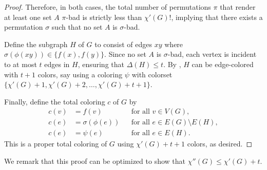 \begin{proof}
    Therefore,
    in both cases,
    the total number of permutations \(\pi\) that render at least one set \(A\) \(\pi\)-bad is strictly less than \(\chi'(G)!\),
    implying that there exists a permutation \(\sigma\) such that no set \(A\) is \(\sigma\)-bad.
    
    Define the subgraph \(H\) of \(G\) to consist of edges \(xy\) where \(\sigma(\phi(xy)) \in \{ f(x), f(y) \}\).
    Since no set \(A\) is \(\sigma\)-bad, each vertex is incident to at most \(t\) edges in \(H\), ensuring that \(\Delta(H) \leq t\).
    By , \(H\) can be edge-colored with \(t + 1\) colors, say using a coloring \(\psi\) with colorset \(\{\chi'(G) + 1, \chi'(G) + 2, \ldots, \chi'(G) + t + 1\}\).
    
    Finally, define the total coloring \(c\) of \(G\) by
    \begin{align}
        c(v) & = f(v)            && \text{for all } v \in V(G),                \\
        c(e) & = \sigma(\phi(e)) && \text{for all } e \in E(G) \setminus E(H), \\
        c(e) & = \psi(e)         && \text{for all } e \in E(H).
    \end{align}
    This is a proper total coloring of \(G\) using \(\chi'(G) + t + 1\) colors, as desired.
\end{proof}

We remark that this proof can be optimized to show that \(\chi''(G) \leq \chi'(G) + t\).